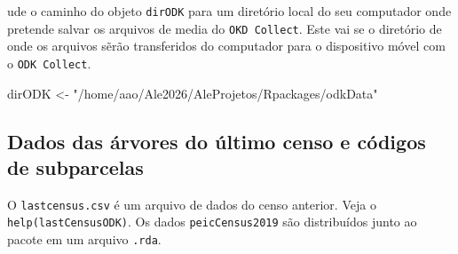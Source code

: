 \documentclass[
  letterpaper,
]{report}
\newenvironment{Shaded}{\begin{snugshade}}{\end{snugshade}}
\newcommand{\NormalTok}[1]{\textcolor[rgb]{0.00,0.23,0.31}{#1}}
\newcommand{\OtherTok}[1]{\textcolor[rgb]{0.00,0.23,0.31}{#1}}
\newcommand{\StringTok}[1]{\textcolor[rgb]{0.13,0.47,0.30}{#1}}
\begin{document}
\begin{tcolorbox}[enhanced jigsaw, arc=.35mm, bottomrule=.15mm, bottomtitle=1mm, breakable, colback=white, colbacktitle=quarto-callout-tip-color!10!white, colframe=quarto-callout-tip-color-frame, coltitle=black, left=2mm, leftrule=.75mm, opacityback=0, opacitybacktitle=0.6, rightrule=.15mm, title=\textcolor{quarto-callout-tip-color}{\faLightbulb}\hspace{0.5em}{Importante}, titlerule=0mm, toprule=.15mm, toptitle=1mm]

ude o caminho do objeto \texttt{dirODK} para um diretório local do seu
computador onde pretende salvar os arquivos de media do
\texttt{OKD\ Collect}. Este vai se o diretório de onde os arquivos sẽrão
transferidos do computador para o dispositivo móvel com o
\texttt{ODK\ Collect}.

\end{tcolorbox}

\begin{Shaded}
\begin{Highlighting}[]
\NormalTok{dirODK }\OtherTok{\textless{}{-}} \StringTok{"/home/aao/Ale2026/AleProjetos/Rpackages/odkData"}
\end{Highlighting}
\end{Shaded}

\subsection{Dados das árvores do último censo e códigos de
subparcelas}\label{dados-das-uxe1rvores-do-uxfaltimo-censo-e-cuxf3digos-de-subparcelas}

O \texttt{lastcensus.csv} é um arquivo de dados do censo anterior. Veja
o \texttt{help(lastCensusODK)}. Os dados \texttt{peicCensus2019} são
distribuídos junto ao pacote em um arquivo \texttt{.rda}.
\end{document}
